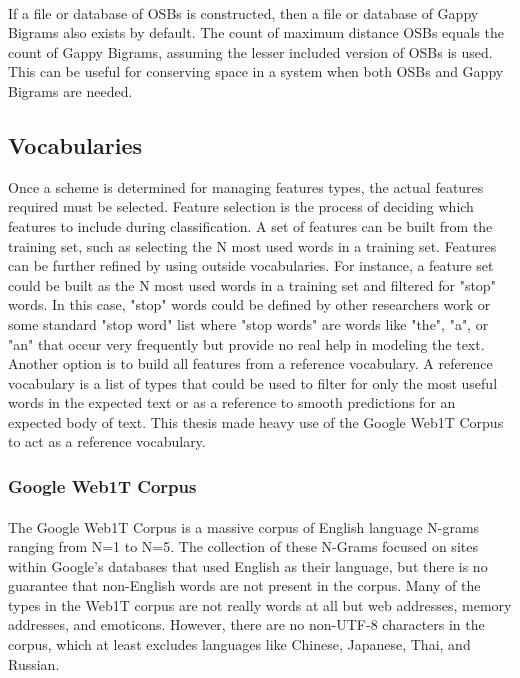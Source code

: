 		\paragraph*{} If a file or database of OSBs is constructed, then a file or database of Gappy Bigrams also exists by default.  The count of maximum distance OSBs equals the count of Gappy Bigrams, assuming the lesser included version of OSBs is used.  This can be useful for conserving space in a system when both OSBs and Gappy Bigrams are needed.

	\subsection {Vocabularies} Once a scheme is determined for managing features types, the actual features required must be selected. Feature selection is the process of deciding which features to include during classification. A set of features can be built from the training set, such as selecting the N most used words in a training set.  Features can be further refined by using outside vocabularies.  For instance, a feature set could be built as the N most used words in a training set and filtered for "stop" words.  In this case, "stop" words could be defined by other researchers work or some standard "stop word" list where "stop words" are words like "the", "a", or "an" that occur very frequently but provide no real help in modeling the text.  Another option is to build all features from a reference vocabulary.  A reference vocabulary is a list of types that could be used to filter for only the most useful words in the expected text or as a reference to smooth predictions for an expected body of text. This thesis made heavy use of the Google Web1T Corpus to act as a reference vocabulary.

	\subsubsection{Google Web1T Corpus}
		\paragraph{} The Google Web1T Corpus is a massive corpus of English language N-grams ranging from N=1 to N=5. The collection of these N-Grams focused on sites within Google's databases that used English as their language, but there is no guarantee that non-English words are not present in the corpus.  Many of the types in the Web1T corpus are not really words at all but web addresses, memory addresses, and emoticons. However, there are no non-UTF-8 characters in the corpus, which at least excludes languages like Chinese, Japanese, Thai, and Russian. 
